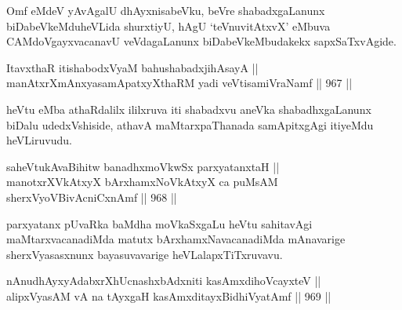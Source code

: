 
\begin{artha}
Omf eMdeV yAvAgalU dhAyxnisabeVku, beVre shabadxgaLanunx biDabeVkeMduheVLida shurxtiyU, hAgU `teV\s nuvitAtxvX' eMbuva CAMdoVgayxvacanavU veVdagaLanunx biDabeVkeMbudakekx sapxSaTxvAgide.
\end{artha}


\begin{shl}
ItavxthaR itishabodxV\s yaM bahushabadxjihAsayA || \\
manAtxrXmAnxyasamApatxyXthaRM yadi veVtisamiVraNamf \hfill || 967 ||  
\end{shl}

\begin{artha}
heVtu eMba athaRdalilx ililxruva iti shabadxvu aneVka shabadhxgaLanunx biDalu udedxVshiside, athavA maMtarxpaThanada samApitxgAgi itiyeMdu heVLiruvudu.
\end{artha}


\begin{shl}
saheVtukAvaBihitw banadhxmoVkwSx parxyatanxtaH || \\
\footnotemark[1]manotxrXVkAtxyX bArxhamxNoVkAtxyX ca puMsAM sherxVyoVBivAcniCxnAmf \hfill || 968 ||  
\end{shl}

\begin{artha}
parxyatanx pUvaRka baMdha moVkaSxgaLu heVtu sahitavAgi maMtarxvacanadiMda matutx bArxhamxNavacanadiMda mAnavarige sherxVyasasxnunx bayasuvavarige heVLalapxTiTxruvavu.
\end{artha}


\begin{shl}
nAnudhAyxyAdabxrXhUcnashxbAdxniti kasAmxdihoVcayxteV || \\
alipxVyasAM vA na tAyxgaH kasAmxditayxBidhiVyatAmf \hfill || 969 ||  
\end{shl}

